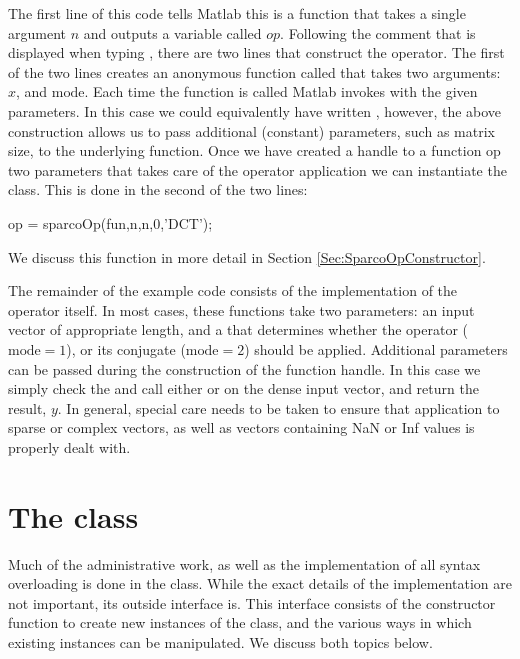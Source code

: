 The first line of this code tells Matlab this is a function that takes
a single argument $n$ and outputs a variable called $op$. Following
the comment that is displayed when typing , there
are two lines that construct the \spot{} operator. The first of the
two lines creates an anonymous function called  that takes
two arguments: $x$, and $\mathrm{mode}$. Each time the 
function is called Matlab invokes  with the given
parameters. In this case we could equivalently have written , however, the above construction allows us to pass
additional (constant) parameters, such as matrix size, to the
underlying function. Once we have created a handle to a function op
two parameters that takes care of the operator application we can
instantiate the \spot{} class. This is done in the second of the two
lines:
\begin{codeblock}
op = sparcoOp(fun,n,n,0,'DCT');
\end{codeblock}
We discuss this function in more detail in Section
\ref{Sec:SparcoOpConstructor}.

The remainder of the example code consists of the implementation of
the operator itself. In most cases, these functions take two
parameters: an input vector of appropriate length, and a 
that determines whether the operator ($\mathrm{mode} = 1$), or its
conjugate ($\mathrm{mode} = 2$) should be applied. Additional
parameters can be passed during the construction of the 
function handle. In this case we simply check the  and
call either  or  on the dense input vector, and
return the result, $y$.  In general, special care needs to be taken to
ensure that application to sparse or complex vectors, as well as
vectors containing NaN or Inf values is properly dealt with.


\section{The  class}

Much of the administrative work, as well as the implementation of all
syntax overloading is done in the  class. While the
exact details of the implementation are not important, its outside
interface is. This interface consists of the constructor function to
create new instances of the class, and the various ways in which
existing instances can be manipulated. We discuss both topics below.

